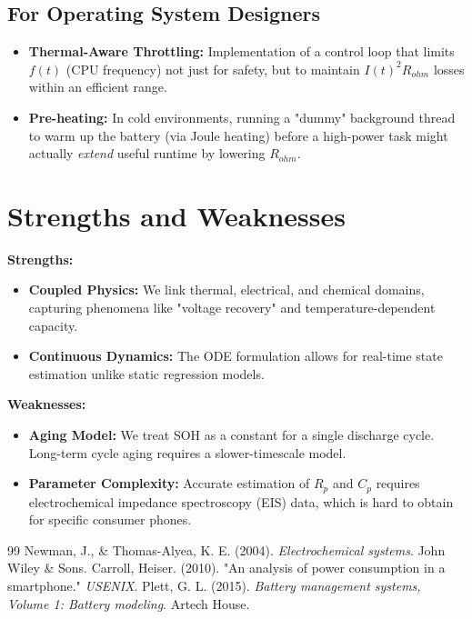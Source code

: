 \documentclass[12pt]{article}
\begin{document}
\subsection{For Operating System Designers}
\begin{itemize}
    \item \textbf{Thermal-Aware Throttling:} Implementation of a control loop that limits $f(t)$ (CPU frequency) not just for safety, but to maintain $I(t)^2 R_{ohm}$ losses within an efficient range.
    \item \textbf{Pre-heating:} In cold environments, running a "dummy" background thread to warm up the battery (via Joule heating) before a high-power task might actually \textit{extend} useful runtime by lowering $R_{ohm}$.
\end{itemize}

\section{Strengths and Weaknesses}
\textbf{Strengths:}
\begin{itemize}
    \item \textbf{Coupled Physics:} We link thermal, electrical, and chemical domains, capturing phenomena like "voltage recovery" and temperature-dependent capacity.
    \item \textbf{Continuous Dynamics:} The ODE formulation allows for real-time state estimation unlike static regression models.
\end{itemize}

\textbf{Weaknesses:}
\begin{itemize}
    \item \textbf{Aging Model:} We treat SOH as a constant for a single discharge cycle. Long-term cycle aging requires a slower-timescale model.
    \item \textbf{Parameter Complexity:} Accurate estimation of $R_p$ and $C_p$ requires electrochemical impedance spectroscopy (EIS) data, which is hard to obtain for specific consumer phones.
\end{itemize}

\begin{thebibliography}{99}
 Newman, J., \& Thomas-Alyea, K. E. (2004). \textit{Electrochemical systems}. John Wiley \& Sons.
 Carroll, Heiser. (2010). "An analysis of power consumption in a smartphone." \textit{USENIX}.
 Plett, G. L. (2015). \textit{Battery management systems, Volume 1: Battery modeling}. Artech House.
\end{thebibliography}
\end{document}
